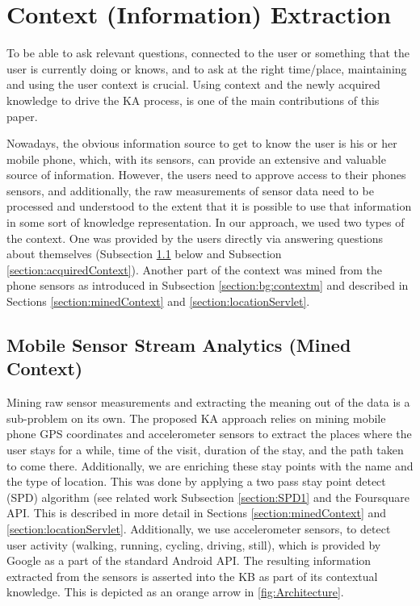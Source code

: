 \section{Context (Information) Extraction}
\label{section:bg:context}
To be able to ask relevant questions, connected to the user or something that 
the user is currently doing or knows, and to ask at the right time/place, 
maintaining and using the user context is crucial. Using context and the newly 
acquired knowledge to drive the KA process, is one of the main contributions 
of this paper. 

Nowadays, the obvious information source to get to know the user is his or her
mobile phone, which, with its sensors, can provide an extensive and valuable 
source of information. However, the users need to approve access to their
phones sensors, and additionally, the raw measurements of sensor data need to
be processed and understood to the extent that it is possible to use that 
information in some sort of knowledge representation. In our approach, we used 
two types of the context. One was provided by the users directly via answering 
questions about themselves (Subsection \ref{section:bg:contextu} below and 
Subsection \ref{section:acquiredContext}). Another part 
of the context was mined from the phone sensors as introduced in 
Subsection \ref{section:bg:contextm} and described in Sections 
\ref{section:minedContext} and \ref{section:locationServlet}.

\subsection{Mobile Sensor Stream Analytics (Mined Context)} 
\label{section:bg:contextu}
Mining raw sensor measurements and extracting the meaning out of the data is a 
sub-problem on its own. The proposed KA approach relies on mining mobile phone 
GPS coordinates and accelerometer sensors to extract the places where the user 
stays for a while, time of the visit, duration of the stay, and the path taken
to come there. Additionally, we are enriching these stay points with the name
and the type of location. This was done by applying a two pass stay point detect
(SPD) algorithm (see related work Subsection \ref{section:SPD1} and the Foursquare API. 
This is described in more detail in Sections \ref{section:minedContext} and
\ref{section:locationServlet}. Additionally, we use accelerometer sensors, 
to detect user activity (walking, running, cycling, driving, still), which is 
provided by Google as a part of the standard Android API. The resulting 
information extracted from the sensors is asserted into the KB as part of its 
contextual knowledge. This is depicted as an orange arrow in 
\autoref{fig:Architecture}.


